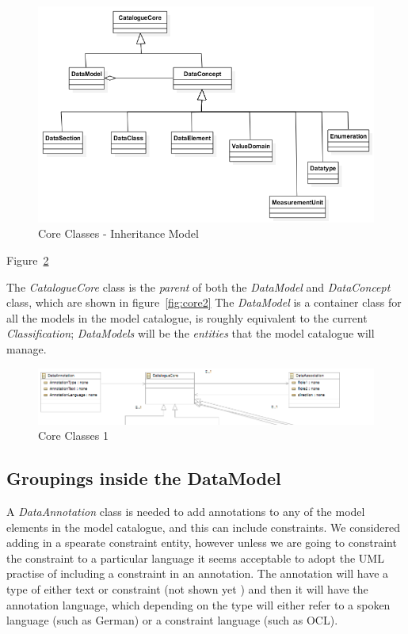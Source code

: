 \documentclass{article}
\begin{document}
 \begin{figure}[here]
\includegraphics[scale=0.4]{images/inheritance}
\caption{Core Classes - Inheritance Model} 
\label{fig:inheritance}
\end{figure}

Figure~\ref{fig:core1} 



The \emph{CatalogueCore} class is the \emph{parent} of both the \emph{DataModel} and \emph{DataConcept} class, which are shown in figure~\ref{fig:core2} The \emph{DataModel} is a container class for all the models in the model catalogue, is roughly equivalent to the current \emph{Classification};  \emph{DataModels} will be the \emph{entities} that the model catalogue will manage.

 \begin{figure}[here]
\includegraphics[scale=0.4]{images/core1}
\caption{Core Classes 1} 
\label{fig:core1}
\end{figure}

\subsection{Groupings inside the DataModel}

A \emph{DataAnnotation} class is needed to add annotations to any of the model elements in the model catalogue, and this can include constraints. We considered adding in a spearate constraint entity, however unless we are going to constraint the constraint to a particular language it seems acceptable to adopt the UML practise of including a constraint in an annotation. The annotation will have a type of either text or constraint (not shown yet ) and then it will have the annotation language, which depending on the type will either refer to a spoken language (such as German) or a constraint language (such as OCL).
\end{document}
